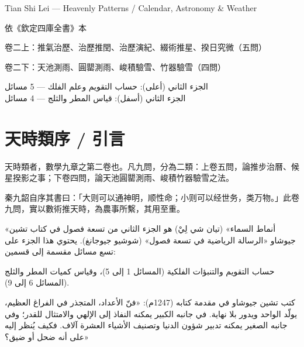 \documentclass[11pt,a4paper]{article}
\newcommand{\ChinCol}[1]{\begin{minipage}[t]{0.48\textwidth}#1\end{minipage}}
\newcommand{\ArabCol}[1]{\begin{minipage}[t]{0.48\textwidth}\arabicfont\beginR #1\endR\end{minipage}}
\newcommand{\parallelsection}[2]{%
  \noindent\ChinCol{#1}\hfill\ArabCol{#2}\par\vspace{0.5cm}%
}
\begin{document}
\begin{titlepage}
\begin{center}
\vspace{0.3cm}

{\fontsize{11}{14}\selectfont\color{notecolor} Tian Shi Lei --- Heavenly Patterns / Calendar, Astronomy \& Weather}

\vfill

{\small 依《欽定四庫全書》本}

\vspace{0.2cm}

{\small\color{notecolor} 卷二上：推氣治歷、治歷推閏、治歷演紀、綴術推星、揆日究微（五問）}

{\small\color{notecolor} 卷二下：天池測雨、圓罌測雨、峻積驗雪、竹器驗雪（四問）}

\vspace{0.3cm}

{\small\arabicfont\beginR\color{notecolor}
الجزء الثاني (أعلى): حساب التقويم وعلم الفلك — 5 مسائل\\
الجزء الثاني (أسفل): قياس المطر والثلج — 4 مسائل
\endR}

\end{center}
\end{titlepage}

\tableofcontents
\newpage

\section*{天時類序 / 引言}

\parallelsection{%
天時類者，數學九章之第二卷也。凡九問，分為二類：上卷五問，論推步治曆、候星揆影之事；下卷四問，論天池圓罌測雨、峻積竹器驗雪之法。

秦九韶自序其書曰：「大则可以通神明，顺性命；小则可以经世务，类万物。」此卷九問，實以數術推天時，為農事所繫，其用至重。
}{%
«أنماط السماء» (تيان شي لِيْ) هو الجزء الثاني من تسعة فصول في كتاب تشين جيوشاو «الرسالة الرياضية في تسعة فصول» (شوشيو جيوجانغ). يحتوي هذا الجزء على تسع مسائل مقسمة إلى قسمين:

حساب التقويم والتنبؤات الفلكية (المسائل 1 إلى 5)، وقياس كميات المطر والثلج (المسائل 6 إلى 9).

كتب تشين جيوشاو في مقدمة كتابه (1247م): «فنّ الأعداد، المتجذر في الفراغ العظيم، يولّد الواحد ويدور بلا نهاية. في جانبه الكبير يمكنه النفاذ إلى الإلهي والامتثال للقدر؛ وفي جانبه الصغير يمكنه تدبير شؤون الدنيا وتصنيف الأشياء العشرة آلاف. فكيف يُنظر إليه على أنه ضحل أو ضيق؟»
}
\end{document}
